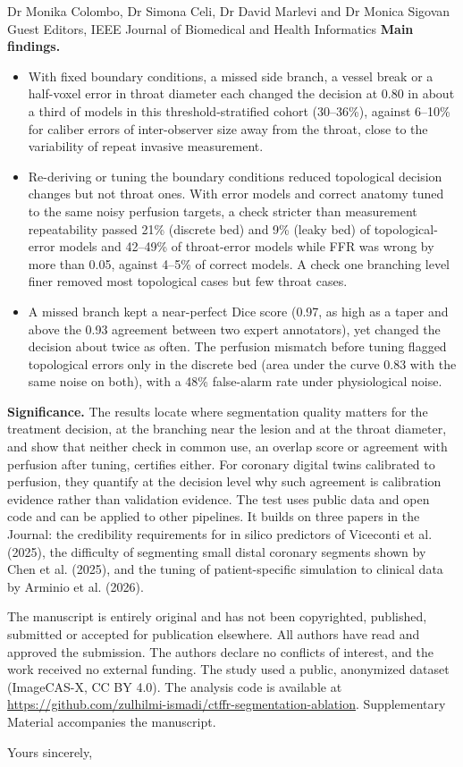 \documentclass[10pt]{letter}
\begin{document}
\begin{letter}{Dr Monika Colombo, Dr Simona Celi, Dr David Marlevi and Dr Monica Sigovan\\Guest Editors, IEEE Journal of Biomedical and Health Informatics}
\textbf{Main findings.}
\begin{itemize}
\item With fixed boundary conditions, a missed side branch, a vessel break or a half-voxel error in throat diameter
each changed the decision at 0.80 in about a third of models in this threshold-stratified cohort (30--36\%), against
6--10\% for caliber errors of inter-observer size away from the throat, close to the variability of repeat invasive
measurement.
\item Re-deriving or tuning the boundary conditions reduced topological decision changes but not throat ones. With
error models and correct anatomy tuned to the same noisy perfusion targets, a check stricter than measurement
repeatability passed 21\% (discrete bed) and 9\% (leaky bed) of topological-error models and 42--49\% of throat-error
models while FFR was wrong by more than 0.05, against 4--5\% of correct models. A check one branching level finer
removed most topological cases but few throat cases.
\item A missed branch kept a near-perfect Dice score (0.97, as high as a taper and above the 0.93 agreement between two
expert annotators), yet changed the decision about twice as often. The perfusion mismatch before tuning flagged topological errors only in the discrete bed (area under the curve 0.83 with the same noise on both), with a 48\% false-alarm rate under physiological noise.
\end{itemize}

\textbf{Significance.} The results locate where segmentation quality matters for the treatment decision, at the
branching near the lesion and at the throat diameter, and show that neither check in common use, an overlap score or
agreement with perfusion after tuning, certifies either. For coronary digital twins calibrated to perfusion, they
quantify at the decision level why such agreement is calibration evidence rather than validation evidence. The test uses public data and open code and can be applied to other pipelines. It builds on three papers in the Journal: the credibility requirements for in silico predictors of
Viceconti et al. (2025), the difficulty of segmenting small distal coronary segments shown by Chen et al. (2025), and
the tuning of patient-specific simulation to clinical data by Arminio et al. (2026).

The manuscript is entirely original and has not been copyrighted, published, submitted or accepted for publication
elsewhere. All authors have read
and approved the submission. The authors declare no conflicts of interest, and the work received no external funding.
The study used a public, anonymized dataset (ImageCAS-X, CC BY 4.0). The analysis code is available at \url{https://github.com/zulhilmi-ismadi/ctffr-segmentation-ablation}. Supplementary Material accompanies the manuscript.

\closing{Yours sincerely,}
\end{letter}
\end{document}
